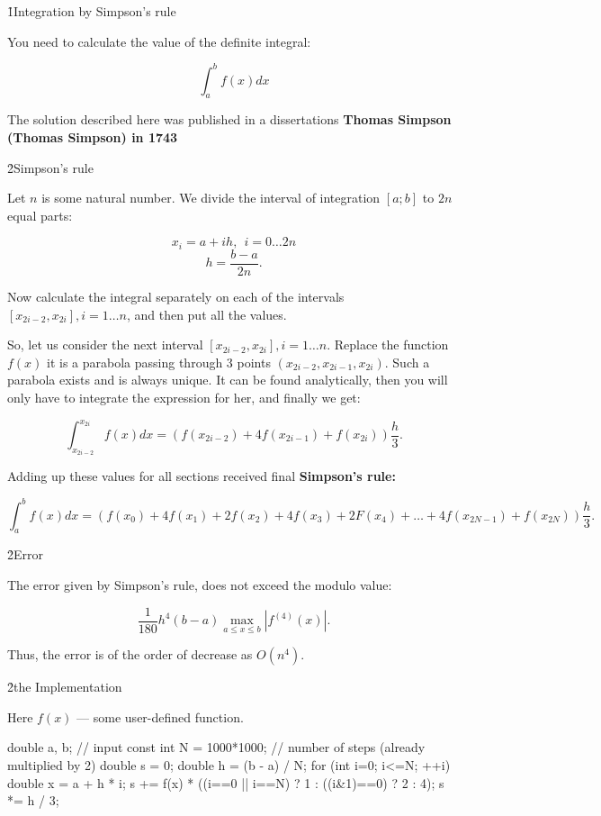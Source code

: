 \h1{Integration by Simpson's rule}

You need to calculate the value of the definite integral:

$$ \int_a^b f(x) dx $$

The solution described here was published in a dissertations \bf{Thomas Simpson} (Thomas Simpson) in 1743


\h2{Simpson's rule}

Let $n$ is some natural number. We divide the interval of integration $[a;b]$ to $2n$ equal parts:

$$ x_i = a + i h,~~i = 0 \ldots 2n $$
$$ h = \frac{ b-a }{ 2n }. $$

Now calculate the integral separately on each of the intervals $[x_{2i-2}, x_{2i}], i = 1 \ldots n$, and then put all the values.

So, let us consider the next interval $[x_{2i-2}, x_{2i}], i = 1 \ldots n$. Replace the function $f(x)$ it is a parabola passing through 3 points $(x_{2i-2},x_{2i-1},x_{2i})$. Such a parabola exists and is always unique. It can be found analytically, then you will only have to integrate the expression for her, and finally we get:

$$ \int_{x_{2i-2}}^{x_{2i}} f(x) dx = \left( f(x_{2i-2}) + 4 f(x_{2i-1}) + f(x_{2i}) \right) \frac{ h }{ 3 }. $$

Adding up these values for all sections received final \bf{Simpson's rule}:

$$ \int_a^b f(x) dx = \left( f(x_0) + 4 f(x_1) + 2 f(x_2) + 4 f(x_3) + 2F(x_4) + \ldots + 4 f(x_{2N-1}) + f(x_{2N}) \right) \frac{ h }{ 3 }. $$


\h2{Error}

The error given by Simpson's rule, does not exceed the modulo value:

$$ \frac{ 1 }{ 180 } h^4 (b - a) \max_{a \le x \le b} \left| f^{(4)}(x) \right|. $$

Thus, the error is of the order of decrease as $O (n^4)$.


\h2{the Implementation}

Here $f(x)$ --- some user-defined function.

\code
double a, b; // input
const int N = 1000*1000; // number of steps (already multiplied by 2)
double s = 0;
double h = (b - a) / N;
for (int i=0; i<=N; ++i) {
double x = a + h * i;
s += f(x) * ((i==0 || i==N) ? 1 : ((i&1)==0) ? 2 : 4);
}
s *= h / 3;
\endcode